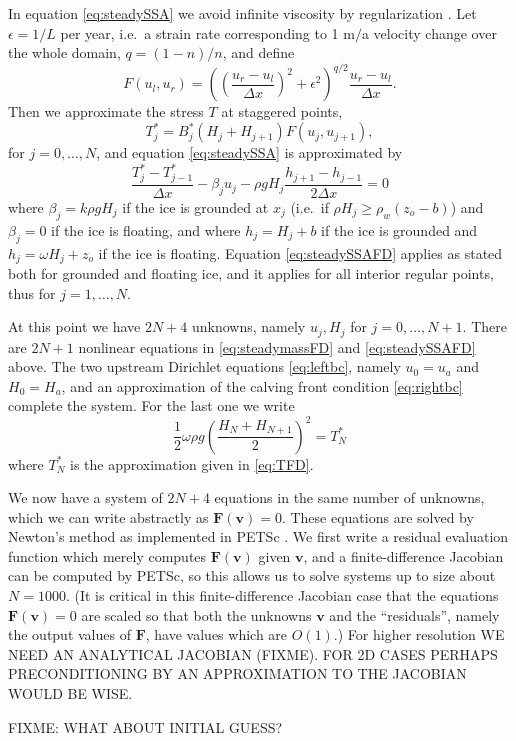 \documentclass[review,letterpaper]{igs}
\newcommand{\eps}{\epsilon}
\begin{document}
In equation \eqref{eq:steadySSA} we avoid infinite viscosity by regularization \citep{SchoofStream}.  Let $\eps=1/L$ per year, i.e.~a strain rate corresponding to 1 m$/$a velocity change over the whole domain, $q = (1-n)/n$, and define
\begin{equation}
F(u_l,u_r) = \left(\left(\frac{u_r-u_l}{\Delta x}\right)^2 + \eps^2\right)^{q/2} \frac{u_r-u_l}{\Delta x}. \label{eq:viscregFD}
\end{equation}
Then we approximate the stress $T$ at staggered points,
\begin{equation}
T_j^* = B_j^* \left(H_j + H_{j+1}\right) F(u_j,u_{j+1}), \label{eq:TFD}
\end{equation}
for $j=0,\dots,N$, and equation \eqref{eq:steadySSA} is approximated by
\begin{equation}
\frac{T_j^* - T_{j-1}^*}{\Delta x} - \beta_j u_j - \rho g H_j \frac{h_{j+1} - h_{j-1}}{2 \Delta x} = 0 \label{eq:steadySSAFD}
\end{equation}
where $\beta_j = k \rho g H_j$ if the ice is grounded at $x_j$ (i.e.~if $\rho H_j \ge \rho_w (z_o - b)$) and $\beta_j=0$ if the ice is floating, and where $h_j = H_j + b$ if the ice is grounded and $h_j = \omega H_j + z_o$ if the ice is floating.  Equation \eqref{eq:steadySSAFD} applies as stated both for grounded and floating ice, and it applies for all interior regular points, thus for $j=1,\dots,N$.

At this point we have $2N+4$ unknowns, namely $u_j,H_j$ for $j=0,\dots,N+1$.  There are $2N+1$ nonlinear equations in \eqref{eq:steadymassFD} and \eqref{eq:steadySSAFD} above.  The two upstream Dirichlet equations \eqref{eq:leftbc}, namely $u_0=u_a$ and $H_0=H_a$, and an approximation of the calving front condition \eqref{eq:rightbc} complete the system.  For the last one we write
\begin{equation}
\frac{1}{2} \omega \rho g \left(\frac{H_N + H_{N+1}}{2}\right)^2 = T_N^* \label{eq:rightbcFD}
\end{equation}
where $T_N^*$ is the approximation given in \eqref{eq:TFD}.

We now have a system of $2N+4$ equations in the same number of unknowns, which we can write abstractly as $\mathbf{F}(\mathbf{v})=0$.  These equations are solved by Newton's method \citep{Kelley} as implemented in PETSc \citep{petsc-user-ref}.  We first write a residual evaluation function which merely computes $\mathbf{F}(\mathbf{v})$ given $\mathbf{v}$, and a finite-difference Jacobian can be computed by PETSc, so this allows us to solve systems up to size about $N=1000$.  (It is critical in this finite-difference Jacobian case that the equations $\mathbf{F}(\mathbf{v})=0$ are scaled so that both the unknowns $\mathbf{v}$ and the ``residuals'', namely the output values of $\mathbf{F}$, have values which are $O(1)$.)  For higher resolution WE NEED AN ANALYTICAL JACOBIAN (FIXME).  FOR 2D CASES PERHAPS PRECONDITIONING BY AN APPROXIMATION TO THE JACOBIAN WOULD BE WISE.  

FIXME: WHAT ABOUT INITIAL GUESS?
\end{document}
